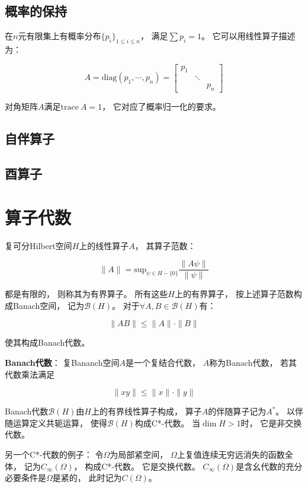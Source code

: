 \documentclass[10pt, openany]{book}
\begin{document}
\section{概率的保持}

在$n$元有限集上有概率分布$\{p_i\}_{1 \leq i \leq n}$，
满足$\sum p_i = 1$。
它可以用线性算子描述为：

$$
A = \text{diag}(p_1,\cdots,p_n) 
= \begin{bmatrix}
p_1 & & \\ & \ddots & \\ & & p_n
\end{bmatrix}
$$

对角矩阵$A$满足$\text{trace} \ A = 1$，
它对应了概率归一化的要求。

\section{自伴算子}

\section{酉算子}

\chapter{算子代数}

复可分Hilbert空间$H$上的线性算子$A$，
其算子范数：

$$
\|A\| = \text{sup}_{\psi \in H - \{0\}} \frac{\|A \psi\|}{\|\psi\|}
$$

都是有限的，
则称其为有界算子。
所有这些$H$上的有界算子，
按上述算子范数构成Banach空间，
记为$\mathcal B(H)$。
对于$\forall A,B \in \mathcal B(H)$有：

$$
\|AB\| \leq \|A\|\cdot\|B\|
$$

使其构成Banach代数。

\textbf{Banach代数}：
复Bananch空间$A$是一个复结合代数，
$A$称为Banach代数，
若其代数乘法满足

$$
\|xy\| \leq \|x\|\cdot\|y\|
$$

Banach代数$\mathcal B(H)$由$H$上的有界线性算子构成，
算子$A$的伴随算子记为$A^*$。
以伴随运算定义共轭运算，
使得$\mathcal B(H)$构成C*-代数。
当$\dim H > 1$时，
它是非交换代数。

另一个C*-代数的例子：
令$\Omega$为局部紧空间，
$\Omega$上复值连续无穷远消失的函数全体，
记为$C_\infty(\Omega)$，
构成C*-代数。
它是交换代数。
$C_\infty(\Omega)$是含幺代数的充分必要条件是$\Omega$是紧的，
此时记为$C(\Omega)$。
\end{document}
